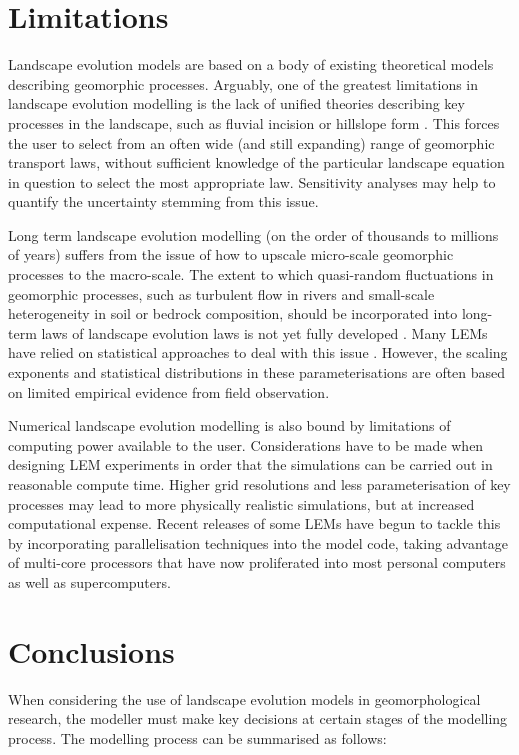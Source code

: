 \section{Limitations}

Landscape evolution models are based on a body of existing theoretical models describing geomorphic processes. Arguably, one of the greatest limitations in landscape evolution modelling is the lack of unified theories describing key processes in the landscape, such as fluvial incision or hillslope form \citep{dietrich2003geomorphic}. This forces the user to select from an often wide (and still expanding) range of geomorphic transport laws, without sufficient knowledge of the particular landscape equation in question to select the most appropriate law. Sensitivity analyses may help to quantify the uncertainty stemming from this issue.

Long term landscape evolution modelling (on the order of thousands to millions of years) suffers from the issue of how to upscale micro-scale geomorphic processes to the macro-scale. The extent to which quasi-random fluctuations in geomorphic processes, such as turbulent flow in rivers and small-scale heterogeneity in soil or bedrock composition, should be incorporated into long-term laws of landscape evolution laws is not yet fully developed \citep{Tucker2010}. Many LEMs have relied on statistical approaches to deal with this issue \citep{Hovius1997,Lague2005,Lague2013}. However, the scaling exponents and statistical distributions in these parameterisations are often based on limited empirical evidence from field observation.

Numerical landscape evolution modelling is also bound by limitations of computing power available to the user. Considerations have to be made when designing LEM experiments in order that the simulations can be carried out in reasonable compute time. Higher grid resolutions and less parameterisation of key processes may lead to more physically realistic simulations, but at increased computational expense. Recent releases of some LEMs have begun to tackle this by incorporating parallelisation techniques into the model code, taking advantage of multi-core processors that have now proliferated into most personal computers as well as supercomputers.

\section{Conclusions}
When considering the use of landscape evolution models in geomorphological research, the modeller must make key decisions at certain stages of the modelling process. The modelling process can be summarised as follows: 

